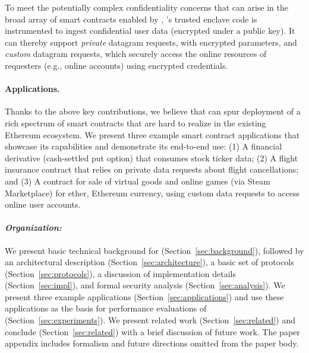\vspace{2mm}
 To meet the potentially complex confidentiality concerns that can arise in the broad array of smart contracts enabled by \tc, \tc's trusted enclave code is instrumented to ingest confidential user data (encrypted under a \tc public key). It can thereby support {\em private} datagram requests, with encrypted parameters, and {\em custom} datagram requests, which securely access the online resources of requesters (e.g., online accounts) using encrypted credentials. 

\vspace{-3mm}
\paragraph{Applications.} Thanks to the above key contributions, we believe that \tc can spur deployment of a rich spectrum of smart contracts that are hard to realize in the existing Ethereum ecosystem. We present three example smart contract applications that showcase its capabilities and demonstrate its end-to-end use: (1) A financial derivative (cash-settled put option) that consumes stock ticker data; (2) A flight insurance contract that relies on private data requests about flight cancellations; and (3) A contract for sale of virtual goods and online games (via Steam Marketplace) for ether, Ethereum currency, using custom data requests to access online user accounts. 

\vspace{-2mm}
\paragraph{\em Organization:} We present basic technical background for \tc (Section~\ref{sec:background}), followed by an architectural description (Section~\ref{sec:architecture}), a basic set of protocols (Section~\ref{sec:protocols}), a discussion of implementation details (Section~\ref{sec:impl}), and formal security analysis (Section~\ref{sec:analysis}). We present three example applications (Section~\ref{sec:applications}) and use these applications as the basis for performance evaluations of \tc (Section~\ref{sec:experiments}).  We present related work (Section~\ref{sec:related}) and conclude (Section~\ref{sec:related}) with a brief discussion of future work. The paper appendix includes formalism and future directions omitted from the paper body.




